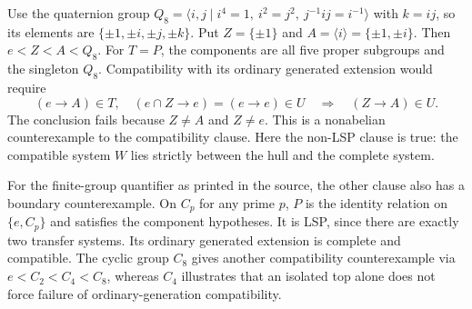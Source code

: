 \documentclass[11pt]{article}
\begin{document}
Use the quaternion group
$Q_8=\langle i,j\mid i^4=1,\ i^2=j^2,\ j^{-1}ij=i^{-1}\rangle$
with $k=ij$, so its elements are $\{\pm1,\pm i,\pm j,\pm k\}$.
Put
$Z=\{\pm1\}$ and $A=\langle i\rangle=\{\pm1,\pm i\}$.
Then $e<Z<A<Q_8$. For $T=P$, the components are all five proper
subgroups and the singleton $Q_8$. Compatibility with its ordinary
generated extension would require
\[
 (e\to A)\in T,\quad (e\cap Z\to e)=(e\to e)\in U
 \quad\Longrightarrow\quad (Z\to A)\in U.
\]
The conclusion fails because $Z\ne A$ and $Z\ne e$.
This is a nonabelian counterexample to the compatibility clause.
Here the non-LSP clause is true: the compatible system $W$ lies strictly
between the hull and the complete system.

For the finite-group quantifier as printed in the source, the other clause
also has a boundary counterexample. On $C_p$ for any prime $p$, $P$ is the
identity relation on $\{e,C_p\}$ and satisfies the component hypotheses.
It is LSP, since there are exactly two transfer systems. Its ordinary
generated extension is complete and compatible.
The cyclic group $C_8$ gives another compatibility counterexample via
$e<C_2<C_4<C_8$, whereas $C_4$ illustrates that an isolated top alone does
not force failure of ordinary-generation compatibility.
\end{document}

